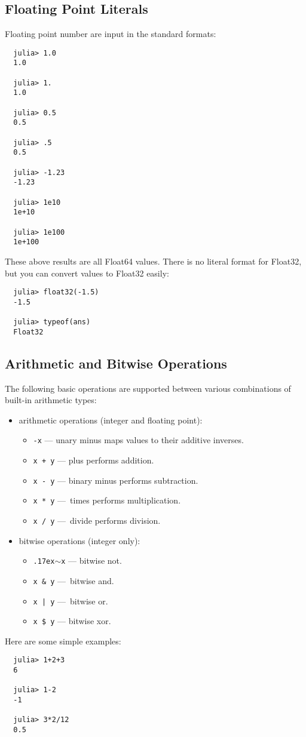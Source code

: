 \documentclass{article}
\newcommand{\til}{\raise.17ex\hbox{$\scriptstyle\sim$}}
\begin{document}
\subsection{Floating Point Literals}

Floating point number are input in the standard formats:
\begin{verbatim}
  julia> 1.0
  1.0

  julia> 1.
  1.0

  julia> 0.5
  0.5

  julia> .5
  0.5

  julia> -1.23
  -1.23

  julia> 1e10
  1e+10

  julia> 1e100
  1e+100
\end{verbatim}
These above results are all Float64 values. There is no literal format for Float32, but you can convert values to Float32 easily:
\begin{verbatim}
  julia> float32(-1.5)
  -1.5

  julia> typeof(ans)
  Float32
\end{verbatim}

\subsection{Arithmetic and Bitwise Operations}

The following basic operations are supported between various combinations of built-in arithmetic types:

\begin{itemize}
  \item arithmetic operations (integer and floating point):
  \begin{itemize}
    \item \texttt{-x} — unary minus maps values to their additive inverses.
    \item \texttt{x + y} — plus performs addition.
    \item \texttt{x - y} — binary minus performs subtraction.
    \item \texttt{x * y} — times performs multiplication.
    \item \texttt{x / y} — divide performs division.
  \end{itemize}
  \item bitwise operations (integer only):
  \begin{itemize}
    \item \texttt{\til x} — bitwise not.
    \item \texttt{x \& y} — bitwise and.
    \item \texttt{x | y} — bitwise or.
    \item \texttt{x \$ y} — bitwise xor.
  \end{itemize}
\end{itemize}
Here are some simple examples:
\begin{verbatim}
  julia> 1+2+3
  6

  julia> 1-2
  -1

  julia> 3*2/12
  0.5
\end{verbatim}
\end{document}
